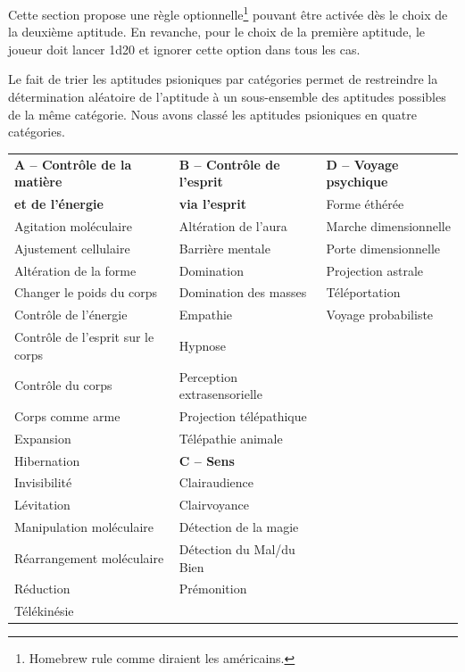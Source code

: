 \documentclass[11pt]{article}
\begin{document}
{\bigskip

Cette section propose une règle optionnelle\footnote{\og Homebrew rule \fg{} comme diraient les américains.} pouvant être activée dès le choix de la deuxième aptitude. En revanche, pour le choix de la première aptitude, le joueur doit lancer 1d20 et ignorer cette option dans tous les cas.

\bigskip

Le fait de trier les aptitudes psioniques par catégories permet de restreindre la détermination aléatoire de l'aptitude à un sous-ensemble des aptitudes possibles de la même catégorie. Nous avons classé les aptitudes psioniques en quatre catégories.

\bigskip

\begin{tabular}{p{5.5cm}p{5.5cm}p{5.5cm}}
\textbf{A -- Contrôle de la matière} & \textbf{B -- Contrôle de l'esprit}   & \textbf{D -- Voyage psychique} \\
\textbf{et de l'énergie}             & \textbf{via l'esprit}                & Forme éthérée \\
Agitation moléculaire                & Altération de l'aura                 & Marche dimensionnelle \\
Ajustement cellulaire               & Barrière mentale                     & Porte dimensionnelle \\
Altération de la forme              & Domination                           & Projection astrale \\
Changer le poids du corps           & Domination des masses                & Téléportation \\
Contrôle de l'énergie               & Empathie                             &  Voyage probabiliste\\
Contrôle de l'esprit sur le corps   & Hypnose & \\
Contrôle du corps                   & Perception extrasensorielle & \\
Corps comme arme                    & Projection télépathique &\\
Expansion                           & Télépathie animale &\\
Hibernation                         & \textbf{C -- Sens} & \\
Invisibilité                        & Clairaudience & \\
Lévitation                          & Clairvoyance & \\
Manipulation moléculaire            & Détection de la magie & \\
Réarrangement moléculaire           & Détection du Mal/du Bien & \\
Réduction                           & Prémonition & \\
Télékinésie                && \\
\end{tabular}

}
\end{document}
